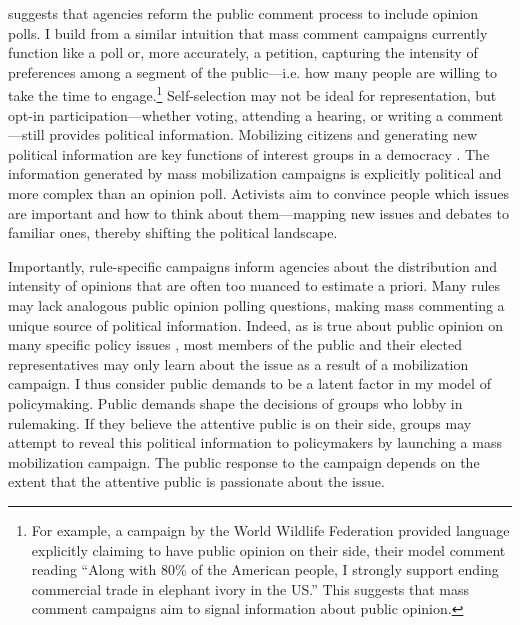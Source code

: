 \citet{Rauch2016} suggests that agencies reform the public comment process to include opinion polls. I build from a similar intuition that mass comment campaigns currently function like a poll or, more accurately, a petition, capturing the intensity of preferences among a segment of the public---i.e. how many people are willing to take the time to engage.\footnote{
For example, %
a campaign by the World Wildlife Federation provided language explicitly claiming to have public opinion on their side, their model comment reading ``Along with 80\% of the American people, I strongly support ending commercial trade in elephant ivory in the US.'' This suggests that mass comment campaigns aim to signal information about public opinion.
} 
Self-selection may not be ideal for representation, but opt-in participation---whether voting, attending a hearing, or writing a comment---still provides political information. 
Mobilizing citizens and generating new political information are key functions of interest groups in a democracy \citep{Mansbridge1992, Mahoney2007}. The information generated by mass mobilization campaigns is explicitly political and more complex than an opinion poll. Activists aim to convince people which issues are important and how to think about them---mapping new issues and debates to familiar ones, thereby shifting the political landscape. 

Importantly, rule-specific campaigns inform agencies about the distribution and intensity of opinions that are often too nuanced to estimate a priori. Many rules may lack analogous public opinion polling questions, making mass commenting a unique source of political information. Indeed, as is true about public opinion on many specific policy issues \citep{Hutchings2003},  most members of the public and their elected representatives may only learn about the issue as a result of a mobilization campaign. I thus consider public demands to be a latent factor in my model of policymaking. Public demands shape the decisions of groups who lobby in rulemaking. If they believe the attentive public is on their side, groups may attempt to reveal this political information to policymakers by launching a mass mobilization campaign. The public response to the campaign depends on the extent that the attentive public is passionate about the issue.%

